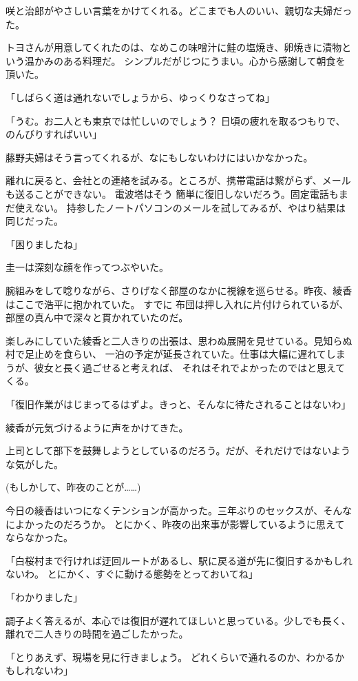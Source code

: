 ﻿\documentclass[
    book,tate,
    line_length=30zw,
    jafontsize=12pt,
    paper=b5j,
    landscape,
    ]{jlreq}
\begin{document}
咲と治郎がやさしい言葉をかけてくれる。どこまでも人のいい、親切な夫婦だった。

トヨさんが用意してくれたのは、なめこの味噌汁に鮭の塩焼き、卵焼きに漬物という温かみのある料理だ。
シンプルだがじつにうまい。心から感謝して朝食を頂いた。

「しばらく道は通れないでしょうから、ゆっくりなさってね」

「うむ。お二人とも東京では忙しいのでしょう？ 日頃の疲れを取るつもりで、のんびりすればいい」

藤野夫婦はそう言ってくれるが、なにもしないわけにはいかなかった。

離れに戻ると、会社との連絡を試みる。ところが、携帯電話は繋がらず、メールも送ることができない。
電波塔はそう 簡単に復旧しないだろう。固定電話もまだ使えない。
持参したノートパソコンのメールを試してみるが、やはり結果は同じだった。

「困りましたね」

圭一は深刻な顔を作ってつぶやいた。

腕組みをして唸りながら、さりげなく部屋のなかに視線を巡らせる。昨夜、綾香はここで浩平に抱かれていた。
すでに 布団は押し入れに片付けられているが、部屋の真ん中で深々と貫かれていたのだ。

楽しみにしていた綾香と二人きりの出張は、思わぬ展開を見せている。見知らぬ村で足止めを食らい、
一泊の予定が延長されていた。仕事は大幅に遅れてしまうが、彼女と長く過ごせると考えれば、
それはそれでよかったのではと思えてくる。

「復旧作業がはじまってるはずよ。きっと、そんなに待たされることはないわ」

綾香が元気づけるように声をかけてきた。

上司として部下を鼓舞しようとしているのだろう。だが、それだけではないような気がした。

(もしかして、昨夜のことが……)

今日の綾香はいつになくテンションが高かった。三年ぶりのセックスが、そんなによかったのだろうか。
とにかく、昨夜の出来事が影響しているように思えてならなかった。

「白桜村まで行ければ迂回ルートがあるし、駅に戻る道が先に復旧するかもしれないわ。
とにかく、すぐに動ける態勢をとっておいてね」

「わかりました」

調子よく答えるが、本心では復旧が遅れてほしいと思っている。少しでも長く、
離れで二人きりの時間を過ごしたかった。

「とりあえず、現場を見に行きましょう。 どれくらいで通れるのか、わかるかもしれないわ」
\end{document}

